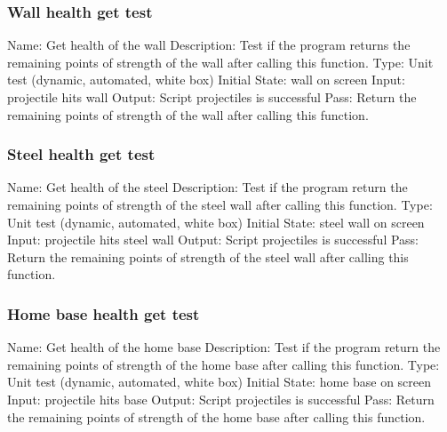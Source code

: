 \documentclass{article}
\begin{document}
\subsubsection{Wall health get test}
Name:  Get health of the wall\newline
Description: Test if the program returns the remaining points of strength of 
the wall after calling this function. \newline
Type: Unit test (dynamic, automated, white box) \newline
Initial State:  wall on screen\newline
Input: projectile hits wall\newline
Output: Script projectiles is successful  \newline
Pass:  Return the remaining points of strength of the wall after calling this 
function. \newline

\subsubsection{Steel health get test}
Name:  Get health of the steel\newline
Description: Test if the program return the remaining points of strength of 
the steel wall after calling this function. \newline
Type: Unit test (dynamic, automated, white box) \newline
Initial State:  steel wall on screen\newline
Input: projectile hits steel wall\newline
Output: Script projectiles is successful  \newline
Pass:  Return the remaining points of strength of the steel wall after calling this 
function. \newline

\subsubsection{Home base health get test}
Name:  Get health of the home base\newline
Description: Test if the program return the remaining points of strength of the
home base after calling this function. \newline
Type: Unit test (dynamic, automated, white box) \newline
Initial State:  home base on screen\newline
Input: projectile hits base\newline
Output: Script projectiles is successful  \newline
Pass:  Return the remaining points of strength of the home base after calling 
this function. \newline
\end{document}
